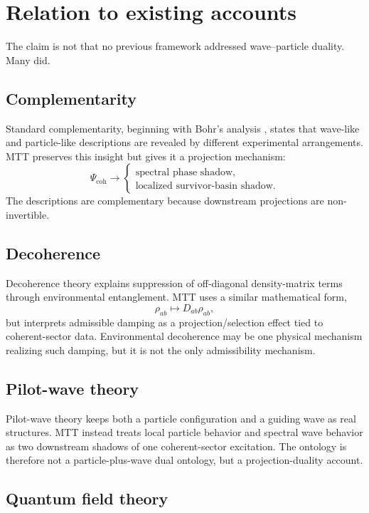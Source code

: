 \documentclass[11pt]{article}
\newcommand{\coh}{\mathrm{coh}}
\begin{document}
\section{Relation to existing accounts}

The claim is not that no previous framework addressed wave--particle duality. Many did.

\subsection{Complementarity}

Standard complementarity, beginning with Bohr's analysis \cite{Bohr}, states that wave-like and particle-like descriptions are revealed by
different experimental arrangements. MTT preserves this insight but gives it a projection
mechanism:
\[
  \Psi_{\coh}
  \to
  \begin{cases}
  \text{spectral phase shadow},\\
  \text{localized survivor-basin shadow}.
  \end{cases}
\]
The descriptions are complementary because downstream projections are non-invertible.

\subsection{Decoherence}

Decoherence theory \cite{Zurek,Schlosshauer} explains suppression of off-diagonal density-matrix terms through environmental
entanglement. MTT uses a similar mathematical form,
\[
  \rho_{ab}\mapsto D_{ab}\rho_{ab},
\]
but interprets admissible damping as a projection/selection effect tied to coherent-sector
data. Environmental decoherence may be one physical mechanism realizing such damping,
but it is not the only admissibility mechanism.

\subsection{Pilot-wave theory}

Pilot-wave theory \cite{Bohm} keeps both a particle configuration and a guiding wave as real structures.
MTT instead treats local particle behavior and spectral wave behavior as two downstream
shadows of one coherent-sector excitation. The ontology is therefore not a particle-plus-wave
dual ontology, but a projection-duality account.

\subsection{Quantum field theory}
\end{document}
